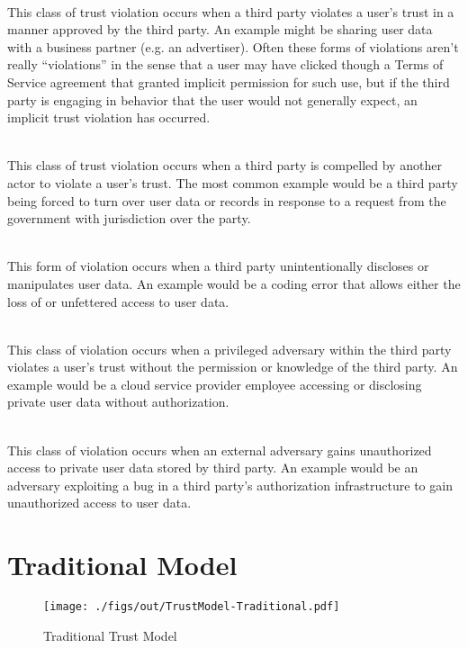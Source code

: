\begin{packed_desc}
\item[Implicit (P):] \hfill \\
  This class of trust violation occurs when a third party violates a
  user's trust in a manner approved by the third party. An example
  might be sharing user data with a business partner (e.g. an
  advertiser). Often these forms of violations aren't really
  ``violations'' in the sense that a user may have clicked though a
  Terms of Service agreement that granted implicit permission for such
  use, but if the third party is engaging in behavior that the user
  would not generally expect, an implicit trust violation has
  occurred.
\item[Compelled (C):] \hfill \\
  This class of trust violation occurs when a third party is compelled
  by another actor to violate a user's trust. The most common example
  would be a third party being forced to turn over user data or
  records in response to a request from the government with
  jurisdiction over the party.
\item[Unintentional (U):] \hfill \\
  This form of violation occurs when a third party unintentionally
  discloses or manipulates user data. An example would be a coding
  error that allows either the loss of or unfettered access to user
  data.
\item[Insider (I):] \hfill \\
  This class of violation occurs when a privileged adversary within
  the third party violates a user's trust without the permission or
  knowledge of the third party. An example would be a cloud service
  provider employee accessing or disclosing private user data without
  authorization.
\item[Outsider (O):] \hfill \\
  This class of violation occurs when an external adversary gains
  unauthorized access to private user data stored by third party. An
  example would be an adversary exploiting a bug in a third party's
  authorization infrastructure to gain unauthorized access to user
  data.
\end{packed_desc}

\section{Traditional Model}
\label{chap:trust:traditional}

\begin{figure}[t]
  \centering
  \texttt{[image: ./figs/out/TrustModel-Traditional.pdf]}
  \caption{Traditional Trust Model}
  \label{fig:trust-traditional}
\end{figure}

